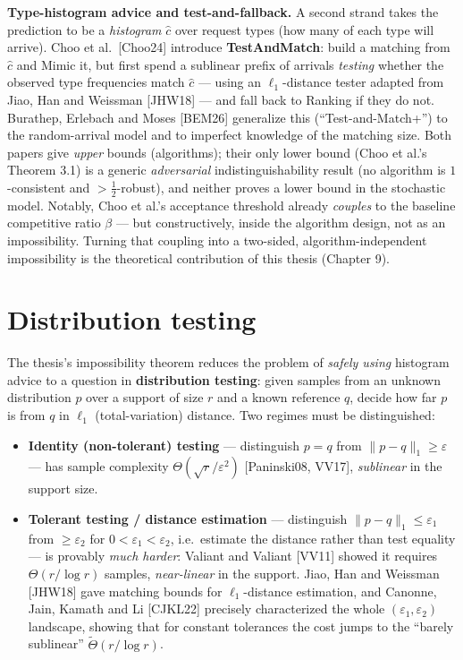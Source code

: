 \textbf{Type-histogram advice and test-and-fallback.} A second strand takes the prediction to
be a \emph{histogram} \(\hat c\) over request types (how many of each type will arrive). Choo et
al.~{[}Choo24{]} introduce \textbf{TestAndMatch}: build a matching from \(\hat c\) and Mimic it, but
first spend a sublinear prefix of arrivals \emph{testing} whether the observed type frequencies
match \(\hat c\) --- using an \(\ell_1\)-distance tester adapted from Jiao, Han and Weissman
{[}JHW18{]} --- and fall back to Ranking if they do not. Burathep, Erlebach and Moses {[}BEM26{]}
generalize this (``Test-and-Match+'') to the random-arrival model and to imperfect knowledge
of the matching size. Both papers give \emph{upper} bounds (algorithms); their only lower bound
(Choo et al.'s Theorem 3.1) is a generic \emph{adversarial} indistinguishability result (no
algorithm is \(1\)-consistent and \(>\tfrac12\)-robust), and neither proves a lower bound in
the stochastic model. Notably, Choo et al.'s acceptance threshold already \emph{couples} to the
baseline competitive ratio \(\beta\) --- but constructively, inside the algorithm design, not
as an impossibility. Turning that coupling into a two-sided, algorithm-independent
impossibility is the theoretical contribution of this thesis (Chapter 9).

\section{Distribution testing}\label{distribution-testing}

The thesis's impossibility theorem reduces the problem of \emph{safely using} histogram advice
to a question in \textbf{distribution testing}: given samples from an unknown distribution \(p\)
over a support of size \(r\) and a known reference \(q\), decide how far \(p\) is from \(q\) in
\(\ell_1\) (total-variation) distance. Two regimes must be distinguished:

\begin{itemize}
\tightlist
\item
  \textbf{Identity (non-tolerant) testing} --- distinguish \(p=q\) from \(\lVert p-q\rVert_1\ge
  \varepsilon\) --- has sample complexity \(\Theta(\sqrt r/\varepsilon^2)\) {[}Paninski08, VV17{]},
  \emph{sublinear} in the support size.
\item
  \textbf{Tolerant testing / distance estimation} --- distinguish \(\lVert p-q\rVert_1\le
  \varepsilon_1\) from \(\ge\varepsilon_2\) for \(0<\varepsilon_1<\varepsilon_2\), i.e.~estimate
  the distance rather than test equality --- is provably \emph{much harder}: Valiant and Valiant
  {[}VV11{]} showed it requires \(\Theta(r/\log r)\) samples, \emph{near-linear} in the support.
  Jiao, Han and Weissman {[}JHW18{]} gave matching bounds for \(\ell_1\)-distance estimation, and
  Canonne, Jain, Kamath and Li {[}CJKL22{]} precisely characterized the whole
  \((\varepsilon_1,\varepsilon_2)\) landscape, showing that for constant tolerances the cost
  jumps to the ``barely sublinear'' \(\tilde\Theta(r/\log r)\).
\end{itemize}

